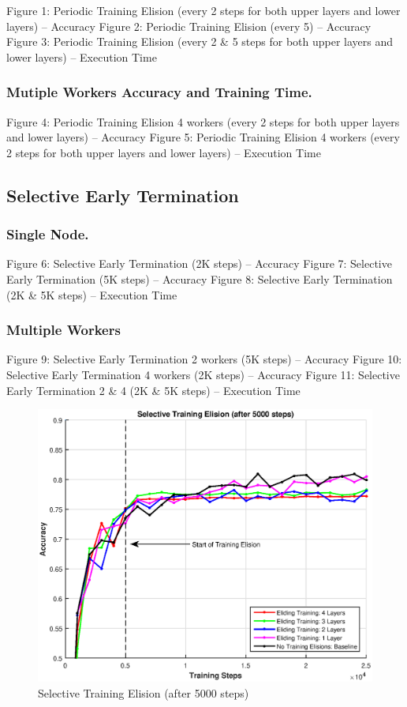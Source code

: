 Figure 1: Periodic Training Elision (every 2 steps for both upper layers and lower layers) -- Accuracy
Figure 2: Periodic Training Elision (every 5) -- Accuracy
Figure 3: Periodic Training Elision (every 2 \& 5 steps for both upper layers and lower layers) -- Execution Time
\subsubsection{Mutiple Workers Accuracy and Training Time.}
Figure 4: Periodic Training Elision 4 workers (every 2 steps for both upper layers and lower layers) -- Accuracy
Figure 5: Periodic Training Elision 4 workers (every 2 steps for both upper layers and lower layers) -- Execution Time
\subsection{Selective Early Termination}
\subsubsection{Single Node.} 
Figure 6: Selective Early Termination (2K steps) -- Accuracy
Figure 7: Selective Early Termination (5K steps) -- Accuracy
Figure 8: Selective Early Termination (2K \& 5K steps) -- Execution Time
\subsubsection{Multiple Workers}
Figure 9: Selective Early Termination 2 workers (5K steps) -- Accuracy 
Figure 10: Selective Early Termination 4 workers (2K steps) -- Accuracy
Figure 11: Selective Early Termination 2 \& 4 (2K \& 5K steps) -- Execution Time
\begin{figure}[t]
	\centering
	\includegraphics[width=0.8\columnwidth]{figures/approx.eps}
	\caption{Selective Training Elision (after 5000 steps)}
	\label{fig:approx}
\end{figure}

